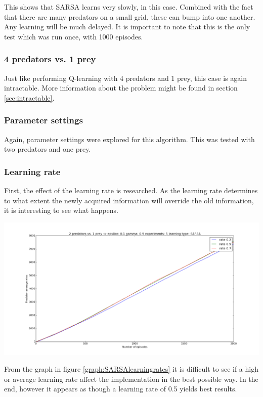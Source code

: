 This shows that SARSA learns very slowly, in this case. Combined with the fact that there are many predators on a small grid, these can bump into one another. Any learning will be much delayed. It is important to note that this is the only test which was run once, with 1000 episodes.

\subsubsection{4 predators vs. 1 prey}
Just like performing Q-learning with 4 predators and 1 prey, this case is again intractable. More information about the problem might be found in section \ref{sec:intractable}.

\subsubsection{Parameter settings}
Again, parameter settings were explored for this algorithm. This was tested with two predators and one prey.

\subsubsection{Learning rate}
First, the effect of the learning rate is researched. As the learning rate determines to what extent the newly acquired information will override the old information, it is interesting to see what happens. 

\begin{center}
	\includegraphics[scale=0.3]{2_predators_learning_rate_SARSA}
	\label{graph:SARSAlearningrates}
\end{center}

From the graph in figure \ref{graph:SARSAlearningrates} it is difficult to see if a high or average learning rate affect the implementation in the best possible way. In the end, however it appears as though a learning rate of 0.5 yields best results.

